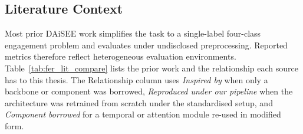 \subsection{Literature Context}\label{sec:results_fer_literature}

Most prior \ac{DAiSEE} work simplifies the task to a single-label
four-class engagement problem and evaluates under undisclosed
preprocessing. Reported metrics therefore reflect heterogeneous
evaluation environments.
Table~\ref{tab:fer_lit_compare} lists the prior work and the
relationship each source has to this thesis. The Relationship
column uses \textit{Inspired by} when only a backbone or
component was borrowed, \textit{Reproduced under our pipeline}
when the architecture was retrained from scratch under the
standardised setup, and \textit{Component borrowed} for a
temporal or attention module re-used in modified form.
